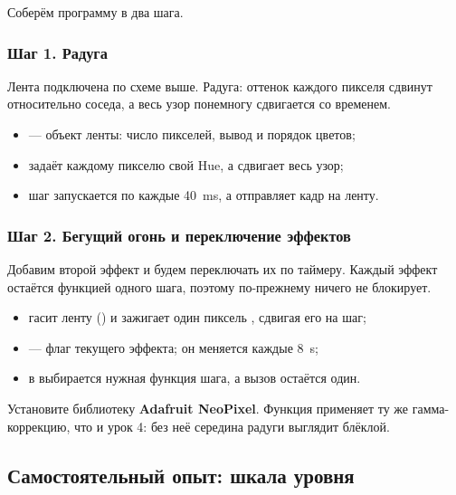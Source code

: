 Соберём программу в два шага.

\subsubsection{Шаг 1. Радуга}

Лента подключена по схеме выше. Радуга: оттенок каждого пикселя сдвинут относительно соседа, а весь
узор понемногу сдвигается со временем.


\begin{itemize}[leftmargin=*]
  \item {} --- объект ленты: число пикселей, вывод и порядок цветов;
  \item {} задаёт каждому пикселю свой Hue, а  сдвигает весь узор;
  \item шаг запускается по  каждые \SI{40}{ms}, а  отправляет кадр на ленту.
\end{itemize}

\subsubsection{Шаг 2. Бегущий огонь и переключение эффектов}

Добавим второй эффект и будем переключать их по таймеру. Каждый эффект остаётся функцией одного шага,
поэтому  по-прежнему ничего не блокирует.


\begin{itemize}[leftmargin=*]
  \item {} гасит ленту () и зажигает один пиксель , сдвигая его на шаг;
  \item {} --- флаг текущего эффекта; он меняется каждые \SI{8}{s};
  \item в  выбирается нужная функция шага, а вызов  остаётся один.
\end{itemize}

Установите библиотеку \textbf{Adafruit NeoPixel}. Функция  применяет ту же
гамма-коррекцию, что и урок 4: без неё середина радуги выглядит блёклой.

\subsection{Самостоятельный опыт: шкала уровня}


